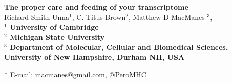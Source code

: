 \begin{flushleft}
{\Large
\textbf{The proper care and feeding of your transcriptome}
} \\

Richard Smith-Unna$^{1}$, 
C. Titus Brown$^{2}$,
Matthew D MacManes $^{3}$, 
\\


\bf{$^{1}$} University of Cambridge \\
\bf{$^{2}$} Michigan State University \\
\bf{$^{3}$} Department of Molecular, Cellular and Biomedical Sciences, University of New Hampshire, Durham NH, USA


$\ast$ E-mail: macmanes@gmail.com, @PeroMHC
\end{flushleft}
